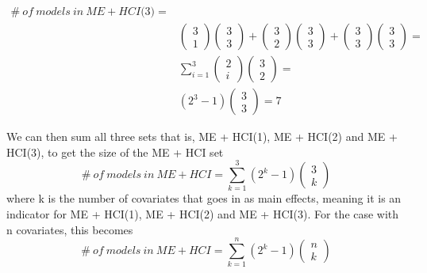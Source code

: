 \begin{equation*}
\begin{aligned}
\#\ of\ models\ in\ ME+HCI\textit{(3)}=\\
&\left( \begin{array}{c}
3 \\ 
1 \end{array}
\right)\left( \begin{array}{c}
3 \\ 
3 \end{array}
\right)+\left( \begin{array}{c}
3 \\ 
2 \end{array}
\right)\left( \begin{array}{c}
3 \\ 
3 \end{array}
\right)+\left( \begin{array}{c}
3 \\ 
3 \end{array}
\right)\left( \begin{array}{c}
3 \\ 
3 \end{array}
\right)= \\
&\sum^3_{i=1}{\left( \begin{array}{c}
2 \\ 
i \end{array}
\right)}\left( \begin{array}{c}
3 \\ 
2 \end{array}
\right)= \\
&\left(2^3-1\right)\left( \begin{array}{c}
3 \\ 
3 \end{array}
\right)=7
\end{aligned}
\end{equation*}


We can then sum all three sets that is, ME + HCI(1), ME + HCI(2) and ME + HCI(3), to get the size of the ME + HCI set
\[\#\ of\ models\ in\ ME+HCI=\sum^3_{k=1}{(2^k-1)\left( \begin{array}{c}
3 \\ 
k \end{array}
\right)}\] where k is the number of covariates that goes in as main effects, meaning it is an indicator for ME + HCI(1), ME + HCI(2) and ME + HCI(3).
For the case with n covariates, this becomes
\[\#\ of\ models\ in\ ME+HCI=\sum^n_{k=1}{(2^k-1)\left( \begin{array}{c}
n \\ 
k \end{array}
\right)}\] 

